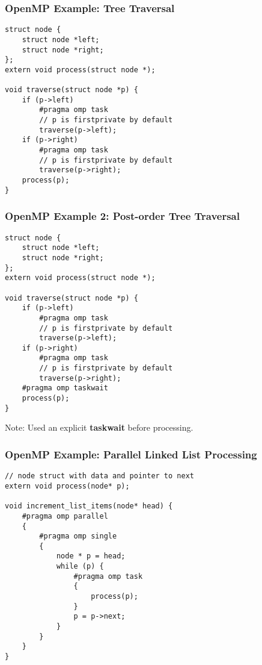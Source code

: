 \begin{frame}[fragile]
  \frametitle{OpenMP Example: Tree Traversal}

  
  \begin{lstlisting}
struct node {
    struct node *left;
    struct node *right;
};
extern void process(struct node *);

void traverse(struct node *p) {
    if (p->left)
        #pragma omp task
        // p is firstprivate by default
        traverse(p->left);
    if (p->right)
        #pragma omp task
        // p is firstprivate by default
        traverse(p->right);
    process(p);
}    
  \end{lstlisting}
  
\end{frame}

\begin{frame}[fragile]
  \frametitle{OpenMP Example 2: Post-order Tree Traversal}

  
  \begin{lstlisting}
struct node {
    struct node *left;
    struct node *right;
};
extern void process(struct node *);

void traverse(struct node *p) {
    if (p->left)
        #pragma omp task
        // p is firstprivate by default
        traverse(p->left);
    if (p->right)
        #pragma omp task
        // p is firstprivate by default
        traverse(p->right);
    #pragma omp taskwait
    process(p);
}    
  \end{lstlisting}
  
  Note: Used an explicit {\bf taskwait} before processing.
  
\end{frame}


\begin{frame}[fragile]
  \frametitle{OpenMP Example: Parallel Linked List Processing}

  
  \begin{lstlisting}
// node struct with data and pointer to next
extern void process(node* p);

void increment_list_items(node* head) {
    #pragma omp parallel
    {
        #pragma omp single
        {
            node * p = head;
            while (p) {
                #pragma omp task
                {
                    process(p);
                }
                p = p->next;
            }
        }
    }
}
  \end{lstlisting}
  
\end{frame}



